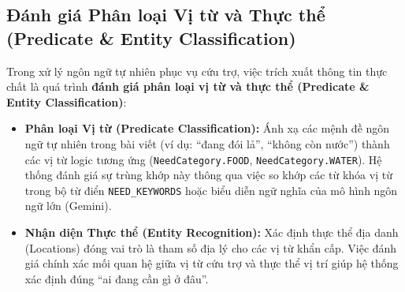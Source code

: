 \documentclass[12pt,a4paper]{article}
\begin{document}
\begin{itemize}
\subsection{Đánh giá Phân loại Vị từ và Thực thể (Predicate \& Entity Classification)}
Trong xử lý ngôn ngữ tự nhiên phục vụ cứu trợ, việc trích xuất thông tin thực chất là quá trình \textbf{đánh giá phân loại vị từ và thực thể (Predicate \& Entity Classification)}:
\begin{itemize}
    \item \textbf{Phân loại Vị từ (Predicate Classification):} Ánh xạ các mệnh đề ngôn ngữ tự nhiên trong bài viết (ví dụ: ``đang đói lả'', ``không còn nước'') thành các vị từ logic tương ứng (\texttt{NeedCategory.FOOD}, \texttt{NeedCategory.WATER}). Hệ thống đánh giá sự trùng khớp này thông qua việc so khớp các từ khóa vị từ trong bộ từ điển \texttt{NEED\_KEYWORDS} hoặc biểu diễn ngữ nghĩa của mô hình ngôn ngữ lớn (Gemini).
    \item \textbf{Nhận diện Thực thể (Entity Recognition):} Xác định thực thể địa danh (Locations) đóng vai trò là tham số địa lý cho các vị từ khẩn cấp. Việc đánh giá chính xác mối quan hệ giữa vị từ cứu trợ và thực thể vị trí giúp hệ thống xác định đúng ``ai đang cần gì ở đâu''.
\end{itemize}


\end{itemize}
\end{document}
